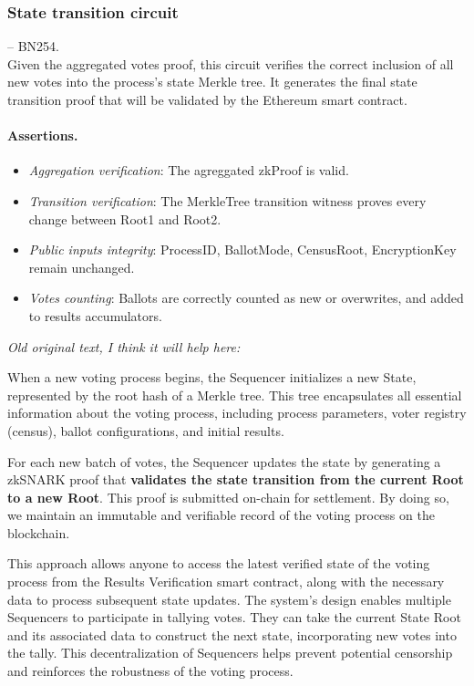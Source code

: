 \newpage
\subsubsection{State transition circuit} -- BN254. \\

\noi Given the aggregated votes proof, this circuit verifies the correct inclusion of all new votes into the process's state Merkle tree. It generates the final state transition proof that will be validated by the Ethereum smart contract.

\paragraph{Assertions.}

\begin{itemize}
	\item \emph{Aggregation verification}: The agreggated zkProof is valid.
	\item \emph{Transition verification}: The MerkleTree transition witness proves every change between Root1 and Root2.
	\item \emph{Public inputs integrity}: ProcessID, BallotMode, CensusRoot, EncryptionKey remain unchanged.
	\item \emph{Votes counting}: Ballots are correctly counted as new or overwrites, and added to results accumulators.
\end{itemize}


\noi \textit{Old original text, I think it will help here:}

When a new voting process begins, the Sequencer initializes a new State, represented by the root hash of a Merkle tree. This tree encapsulates all essential information about the voting process, including process parameters, voter registry (census), ballot configurations, and initial results.

For each new batch of votes, the Sequencer updates the state by generating a zkSNARK proof that \textbf{validates the state transition from the current Root to a new Root}. This proof is submitted on-chain for settlement. By doing so, we maintain an immutable and verifiable record of the voting process on the blockchain.

This approach allows anyone to access the latest verified state of the voting process from the Results Verification smart contract, along with the necessary data to process subsequent state updates. The system's design enables multiple Sequencers to participate in tallying votes. They can take the current State Root and its associated data to construct the next state, incorporating new votes into the tally. This decentralization of Sequencers helps prevent potential censorship and reinforces the robustness of the voting process.

